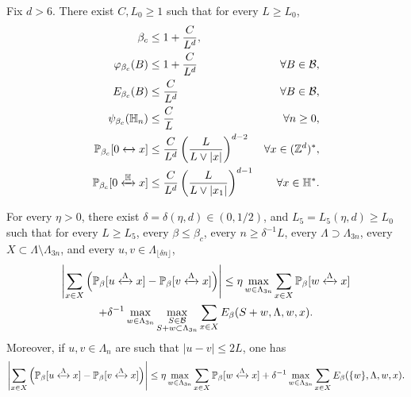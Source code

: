 \documentclass[10pt,a4paper]{amsart}
\newcommand{\connect}{\xleftrightarrow}
\begin{document}
\begin{Prop}\label{prop: final prop proof mainperco thm}
Fix $d>6$. There exist $C,L_0\geq 1$ such that for every $L\geq L_0$,
\begin{align}
\beta_c&\leq 1+\frac{C}{L^d}, \label{eq:bound final beta_c}
\\
\varphi_{\beta_c}(B)&\le 1+\frac{C}{L^d} &\forall B\in\mathcal B,\label{eq:bound final phi block}
\\
E_{\beta_c}(B)&\leq \frac{C}{L^d} &\forall B\in \mathcal B,\label{eq:error amplitude general blocks}
\\
\psi_{\beta_c}(\mathbb H_n)&\le \frac{C}{L} &\forall n\ge 0, \label{eq:bound final psi}
\\
\mathbb P_{\beta_c}[0\connect{}x] &\le \frac{C}{L^d}\left(\frac{L}{L\vee |x|}\right)^{d-2}&\forall x\in (\mathbb Z^d)^*,\label{eq:upper bound below L perco}
\\
\mathbb P_{\beta_c}[0\connect{\mathbb H\:}x]&\le\frac{C}{L^d}\left(\frac{L}{L\vee |x_1|}\right)^{d-1}&\forall x\in \mathbb H^*\label{eq:upper half-spacebound below L perco}.
\end{align} 
\end{Prop}

\begin{Prop}\label{prop:regularitygeneralperco} For every $\eta>0$, there exist $\delta=\delta(\eta,d)\in(0,1/2)$, and $L_5=L_5(\eta,d)\geq L_0$ such that for every $L\geq L_5$, every $\beta\leq \beta_c$, every $n\geq \delta^{-1}L$, every $\Lambda\supset \Lambda_{3n}$, every $X\subset \Lambda\setminus\Lambda_{3n}$, and every $u,v\in \Lambda_{\lfloor \delta n\rfloor}$,
\begin{multline}\label{eq:reg mesoscopic boosted}
\left|\sum_{x\in X}\Big(\mathbb P_\beta[u\connect{\Lambda\:}x]-\mathbb P_\beta[v\connect{\Lambda\:}x]\Big)\right|\le \eta\max_{w\in \Lambda_{3n}}
\sum_{x\in X}\mathbb P_\beta[w\connect{\Lambda\:}x]\\+\delta^{-1}\max_{w\in \Lambda_{3n}}\max_{\substack{S\in \mathcal B\\S+w\subset \Lambda_{3n}}}\sum_{x\in X}E_\beta(S+w,\Lambda,w,x).
\end{multline}
Moreover, if $u,v \in \Lambda_n$ are such that $|u-v|\leq 2L$, one has
\begin{equation}\label{eq:uv close in the statement}
	\left|\sum_{x\in X}\Big(\mathbb P_\beta[u\connect{\Lambda\:}x]-\mathbb P_\beta[v\connect{\Lambda\:}x]\Big)\right|\le \eta\max_{w\in \Lambda_{3n}}
\sum_{x\in X}\mathbb P_\beta[w\connect{\Lambda\:}x]\\+\delta^{-1}\max_{w\in \Lambda_{3n}}\sum_{x\in X}E_\beta(\{w\},\Lambda,w,x).
\end{equation}
\end{Prop}
\end{document}
